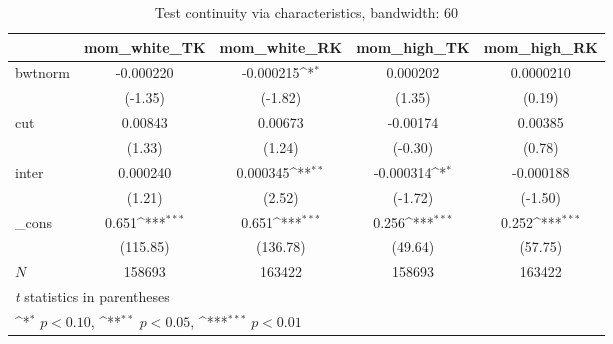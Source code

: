 \begin{table}[htbp]\centering
\def\sym#1{\ifmmode^{#1}\else\(^{#1}\)\fi}
\caption{Test continuity via characteristics, bandwidth: 60}
\begin{tabular}{l*{4}{c}}
\hline\hline
            &\multicolumn{1}{c}{mom\_white\_TK}&\multicolumn{1}{c}{mom\_white\_RK}&\multicolumn{1}{c}{mom\_high\_TK}&\multicolumn{1}{c}{mom\_high\_RK}\\
\hline
bwtnorm     &   -0.000220         &   -0.000215\sym{*}  &    0.000202         &   0.0000210         \\
            &     (-1.35)         &     (-1.82)         &      (1.35)         &      (0.19)         \\
[1em]
cut         &     0.00843         &     0.00673         &    -0.00174         &     0.00385         \\
            &      (1.33)         &      (1.24)         &     (-0.30)         &      (0.78)         \\
[1em]
inter       &    0.000240         &    0.000345\sym{**} &   -0.000314\sym{*}  &   -0.000188         \\
            &      (1.21)         &      (2.52)         &     (-1.72)         &     (-1.50)         \\
[1em]
\_cons      &       0.651\sym{***}&       0.651\sym{***}&       0.256\sym{***}&       0.252\sym{***}\\
            &    (115.85)         &    (136.78)         &     (49.64)         &     (57.75)         \\
\hline
\(N\)       &      158693         &      163422         &      158693         &      163422         \\
\hline\hline
\multicolumn{5}{l}{\footnotesize \textit{t} statistics in parentheses}\\
\multicolumn{5}{l}{\footnotesize \sym{*} \(p<0.10\), \sym{**} \(p<0.05\), \sym{***} \(p<0.01\)}\\
\end{tabular}
\end{table}
